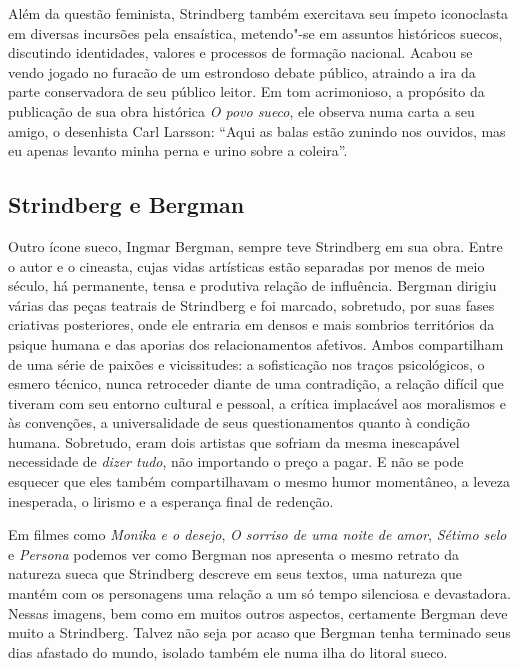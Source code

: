 Além da questão feminista, Strindberg também exercitava seu ímpeto 
iconoclasta em diversas incursões pela ensaística, metendo"-se em assuntos
históricos suecos, discutindo identidades, valores e processos de
formação nacional. Acabou se vendo jogado no furacão de um estrondoso debate
público, atraindo a ira da parte conservadora de seu público leitor. Em
tom acrimonioso, a propósito da publicação de sua obra histórica
\textit{O povo sueco}, ele observa numa carta a seu amigo, o
desenhista Carl Larsson: “Aqui as balas estão zunindo nos
ouvidos, mas eu apenas levanto minha perna e urino sobre a coleira”. 

\subsection{Strindberg e Bergman}

Outro ícone sueco, Ingmar Bergman, sempre teve
Strindberg em sua obra. Entre o autor e o cineasta, cujas vidas
artísticas estão separadas por menos de meio século, há permanente,
tensa e produtiva relação de influência. Bergman dirigiu várias das
peças teatrais de Strindberg e foi marcado, sobretudo, por suas fases
criativas posteriores, onde ele entraria em densos e mais sombrios
territórios da psique humana e das aporias dos relacionamentos
afetivos. Ambos compartilham de uma série de paixões e vicissitudes: a
sofisticação nos traços psicológicos, o esmero técnico, nunca
retroceder diante de uma contradição, a relação difícil que tiveram com
seu entorno cultural e pessoal, a crítica implacável aos moralismos e
às convenções, a universalidade de seus questionamentos quanto à
condição humana. Sobretudo, eram dois artistas que sofriam da mesma
inescapável necessidade de \textit{dizer tudo}, não importando o preço
a pagar. E não se pode esquecer que eles também compartilhavam
o mesmo humor momentâneo, a leveza inesperada, o lirismo e a esperança
final de redenção. 

Em filmes como \textit{Monika e o desejo}, \textit{O sorriso de
uma noite de amor}, \textit{Sétimo selo} e \textit{Persona} podemos ver
como Bergman nos apresenta o mesmo retrato da natureza sueca que
Strindberg descreve em seus textos, uma natureza que mantém com os
personagens uma relação a um só tempo silenciosa e devastadora. Nessas
imagens, bem como em muitos outros aspectos, certamente Bergman deve
muito a Strindberg.  Talvez não seja por acaso que Bergman tenha
terminado seus dias afastado do mundo, isolado também ele numa ilha do
litoral sueco. 


